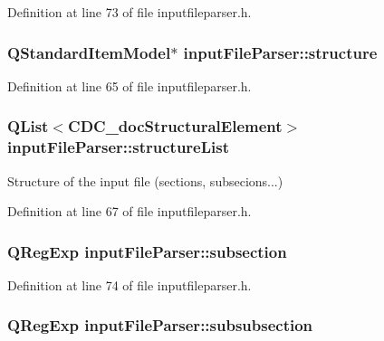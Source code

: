 Definition at line 73 of file inputfileparser.\+h.

\hypertarget{classinput_file_parser_ac875012f371d91ecfc383e61f49ed0d4}{
\subsubsection[{structure}]{\setlength{\rightskip}{0pt plus 5cm}Q\+Standard\+Item\+Model$\ast$ input\+File\+Parser\+::structure\hspace{0.3cm}{\ttfamily [private]}}}\label{classinput_file_parser_ac875012f371d91ecfc383e61f49ed0d4}


Definition at line 65 of file inputfileparser.\+h.

\hypertarget{classinput_file_parser_a74bd2cbf0855006b5586da0b00c9420b}{
\subsubsection[{structure\+List}]{\setlength{\rightskip}{0pt plus 5cm}Q\+List$<${\bf C\+D\+C\+\_\+doc\+Structural\+Element}$>$ input\+File\+Parser\+::structure\+List\hspace{0.3cm}{\ttfamily [private]}}}\label{classinput_file_parser_a74bd2cbf0855006b5586da0b00c9420b}


Structure of the input file (sections, subsecions...) 



Definition at line 67 of file inputfileparser.\+h.

\hypertarget{classinput_file_parser_a70c6d19dc97306b9de996ae534198e96}{
\subsubsection[{subsection}]{\setlength{\rightskip}{0pt plus 5cm}Q\+Reg\+Exp input\+File\+Parser\+::subsection}}\label{classinput_file_parser_a70c6d19dc97306b9de996ae534198e96}


Definition at line 74 of file inputfileparser.\+h.

\hypertarget{classinput_file_parser_a3b119638757867ee5fd27f20cbbc56ec}{
\subsubsection[{subsubsection}]{\setlength{\rightskip}{0pt plus 5cm}Q\+Reg\+Exp input\+File\+Parser\+::subsubsection}}\label{classinput_file_parser_a3b119638757867ee5fd27f20cbbc56ec}


